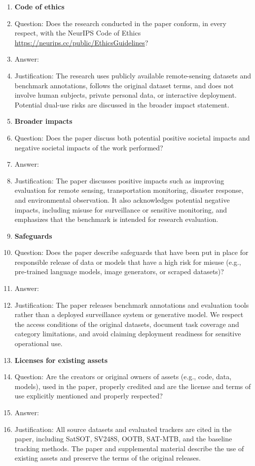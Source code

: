 \begin{enumerate}
    
\item {\bf Code of ethics}
    \item[] Question: Does the research conducted in the paper conform, in every respect, with the NeurIPS Code of Ethics \url{https://neurips.cc/public/EthicsGuidelines}?
    \item[] Answer: \answerYes{}
    \item[] Justification: The research uses publicly available remote-sensing datasets and benchmark annotations, follows the original dataset terms, and does not involve human subjects, private personal data, or interactive deployment. Potential dual-use risks are discussed in the broader impact statement.



\item {\bf Broader impacts}
    \item[] Question: Does the paper discuss both potential positive societal impacts and negative societal impacts of the work performed?
    \item[] Answer: \answerYes{}
    \item[] Justification: The paper discusses positive impacts such as improving evaluation for remote sensing, transportation monitoring, disaster response, and environmental observation. It also acknowledges potential negative impacts, including misuse for surveillance or sensitive monitoring, and emphasizes that the benchmark is intended for research evaluation.

    
\item {\bf Safeguards}
    \item[] Question: Does the paper describe safeguards that have been put in place for responsible release of data or models that have a high risk for misuse (e.g., pre-trained language models, image generators, or scraped datasets)?
    \item[] Answer: \answerYes{}
    \item[] Justification: The paper releases benchmark annotations and evaluation tools rather than a deployed surveillance system or generative model. We respect the access conditions of the original datasets, document task coverage and category limitations, and avoid claiming deployment readiness for sensitive operational use.


\item {\bf Licenses for existing assets}
    \item[] Question: Are the creators or original owners of assets (e.g., code, data, models), used in the paper, properly credited and are the license and terms of use explicitly mentioned and properly respected?
    \item[] Answer: \answerYes{}
    \item[] Justification: All source datasets and evaluated trackers are cited in the paper, including SatSOT, SV248S, OOTB, SAT-MTB, and the baseline tracking methods. The paper and supplemental material describe the use of existing assets and preserve the terms of the original releases.



\end{enumerate}

